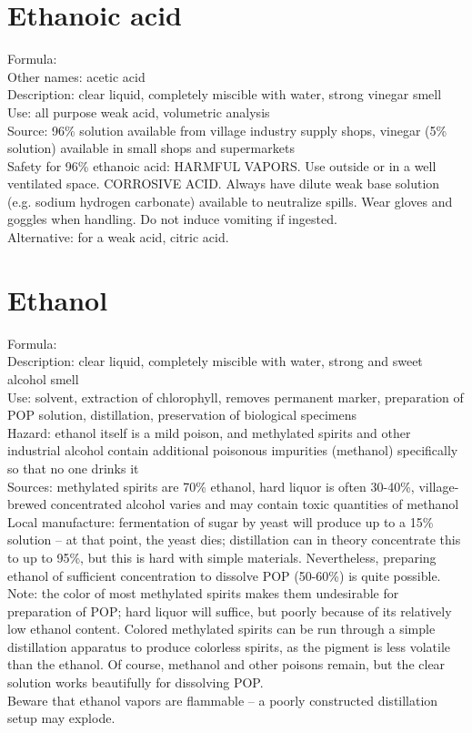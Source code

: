 \section{Ethanoic acid}
\label{sec:ethanoic}
Formula: \\
Other names: acetic acid\\
Description: clear liquid, 
completely miscible with water, 
strong vinegar smell\\
Use: all purpose weak acid, 
volumetric analysis\\
Source: 96\% solution available from village industry supply shops, 
vinegar (5\% solution) available in small shops and supermarkets\\
Safety for 96\% ethanoic acid: HARMFUL VAPORS. 
Use outside or in a well ventilated space. 
CORROSIVE ACID. 
Always have dilute weak base solution (e.g. 
sodium hydrogen carbonate) available to neutralize spills. 
Wear gloves and goggles when handling. 
Do not induce vomiting if ingested.\\
Alternative: for a weak acid, 
citric acid. 

\section{Ethanol}
Formula: \\
Description: clear liquid, 
completely miscible with water, 
strong and sweet alcohol smell\\
Use: solvent, 
extraction of chlorophyll, 
removes permanent marker, 
preparation of POP solution, 
distillation, 
preservation of biological specimens\\
Hazard: ethanol itself is a mild poison, 
and methylated spirits and other industrial alcohol contain 
additional poisonous impurities (methanol) 
specifically so that no one drinks it\\
Sources: methylated spirits are 70\% ethanol, 
hard liquor is often 30-40\%, 
village-brewed concentrated alcohol varies 
and may contain toxic quantities of methanol\\
Local manufacture: fermentation of sugar by yeast will produce 
up to a 15\% solution -- at that point, 
the yeast dies; 
distillation can in theory concentrate this to up to 95\%, 
but this is hard with simple materials. 
Nevertheless, 
preparing ethanol of sufficient concentration to dissolve POP (50-60\%) 
is quite possible.\\
Note: the color of most methylated spirits makes them undesirable 
for preparation of POP; 
hard liquor will suffice, 
but poorly because of its relatively low ethanol content. 
Colored methylated spirits can be run 
through a simple distillation apparatus to produce colorless spirits, 
as the pigment is less volatile than the ethanol. 
Of course, 
methanol and other poisons remain, 
but the clear solution works beautifully for dissolving POP.\\ 
Beware that ethanol vapors are flammable -- 
a poorly constructed distillation setup may explode.

